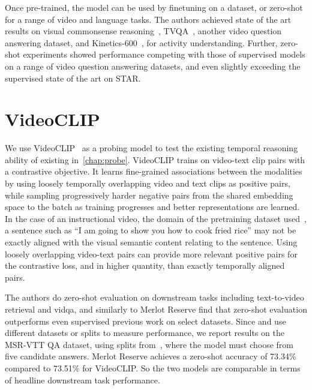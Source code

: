 Once pre-trained, the model can be used by finetuning on a dataset, or
zero-shot for a range of video and language tasks. The authors achieved state
of the art results on visual commonsense reasoning~\citep{zellers2019vcr},
TVQA~\citep{antol2015vqa}, another video question answering dataset, and
Kinetics-600~\citep{carreira2018kinetics600}, for activity understanding.
Further, zero-shot experiments showed performance competing with those of
supervised models on a range of video question answering datasets, and even
slightly exceeding the supervised state of the art on STAR.

\section{VideoCLIP}
\label{sec:videoclip}

We use VideoCLIP~\citep{xu2021videoclip} as a probing model to test the
existing temporal reasoning ability of existing 
in~\cref{chap:probe}. VideoCLIP trains on video-text clip pairs with a
contrastive objective. It learns fine-grained associations between the
modalities by using loosely temporally overlapping video and text clips as
positive pairs, while sampling progressively harder negative pairs from the
shared embedding space to the batch as training progresses and better
representations are learned. In the case of an instructional video, the domain
of the pretraining dataset used~\citep{miech2019howto100m}, a sentence such as
``I am going to show you how to cook fried rice'' may not be exactly aligned
with the visual semantic content relating to the sentence. Using loosely
overlapping video-text pairs can provide more relevant positive pairs for the
contrastive loss, and in higher quantity, than exactly temporally aligned
pairs. 

The authors do zero-shot evaluation on downstream tasks including
text-to-video retrieval and \acrshort{vidqa}, and similarly to Merlot Reserve
find that zero-shot evaluation outperforms even supervised previous work on
select datasets. Since \citet{zellers2022mreserve} and \citet{xu2021videoclip} use
different datasets or splits to measure performance, we report results on
the MSR-VTT QA dataset, using splits from~\citet{xu2017video}, where the
model must choose from five candidate answers. Merlot Reserve achieves a
zero-shot accuracy of 73.34\% compared to 73.51\% for VideoCLIP. So the two
models are comparable in terms of headline downstream task performance.
